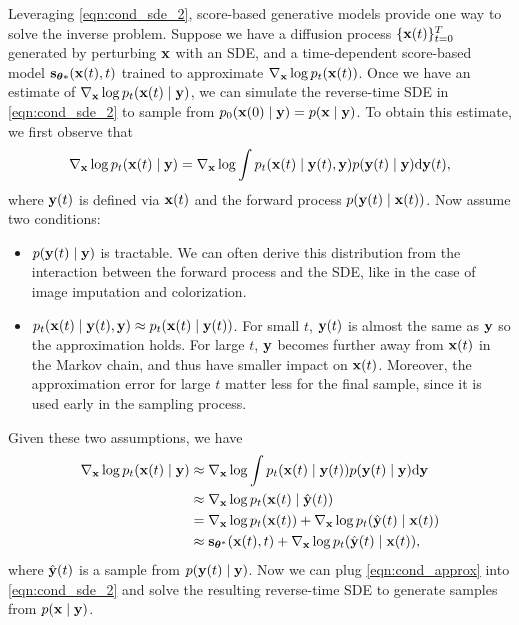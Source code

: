 Leveraging \cref{eqn:cond_sde_2}, score-based generative models provide one way to solve the inverse problem. Suppose we have a diffusion process $\{\mathbf{x}(t)\}_{t=0}^T$ generated by perturbing $\mathbf{x}$ with an SDE, and a time-dependent score-based model $\mathbf{s}_{{\boldsymbol{\theta}}*}(\mathbf{x}(t), t)$ trained to approximate $\nabla_{\mathbf{x}} \log p_t(\mathbf{x}(t))$. Once we have an estimate of $\nabla_{\mathbf{x}} \log p_t(\mathbf{x}(t) \mid \mathbf{y})$, we can simulate the reverse-time SDE in \cref{eqn:cond_sde_2} to sample from $p_0(\mathbf{x}(0) \mid \mathbf{y}) = p(\mathbf{x} \mid \mathbf{y})$. To obtain this estimate, we first observe that
\begin{align*}
    \nabla_{\mathbf{x}} \log p_t(\mathbf{x}(t) \mid \mathbf{y}) = \nabla_{\mathbf{x}} \log \int p_t(\mathbf{x}(t) \mid \mathbf{y}(t), \mathbf{y}) p(\mathbf{y}(t) \mid \mathbf{y}) \mathrm{d} \mathbf{y}(t),
\end{align*}
where $\mathbf{y}(t)$ is defined via $\mathbf{x}(t)$ and the forward process $p(\mathbf{y}(t) \mid \mathbf{x}(t))$. Now assume two conditions:
\begin{itemize}
    \item $p(\mathbf{y}(t) \mid \mathbf{y})$ is tractable. We can often derive this distribution from the interaction between the forward process and the SDE, like in the case of image imputation and colorization.
    \item $p_t(\mathbf{x}(t) \mid \mathbf{y}(t), \mathbf{y}) \approx p_t(\mathbf{x}(t) \mid \mathbf{y}(t))$. For small $t$, $\mathbf{y}(t)$ is almost the same as $\mathbf{y}$ so the approximation holds. For large $t$, $\mathbf{y}$ becomes further away from $\mathbf{x}(t)$ in the Markov chain, and thus have smaller impact on $\mathbf{x}(t)$. Moreover, the approximation error for large $t$ matter less for the final sample, since it is used early in the sampling process.
\end{itemize}
Given these two assumptions, we have
\begin{align}
    \nabla_{\mathbf{x}} \log p_t(\mathbf{x}(t) \mid \mathbf{y}) &\approx \nabla_{\mathbf{x}} \log \int p_t(\mathbf{x}(t) \mid \mathbf{y}(t)) p(\mathbf{y}(t) \mid \mathbf{y}) \mathrm{d} \mathbf{y} \notag\\
    &\approx \nabla_{\mathbf{x}} \log p_t(\mathbf{x}(t) \mid \hat{\mathbf{y}}(t)) \notag\\
    &= \nabla_{\mathbf{x}} \log p_t(\mathbf{x}(t)) + \nabla_{\mathbf{x}} \log p_t(\hat{\mathbf{y}}(t) \mid \mathbf{x}(t)) \notag\\
    &\approx \mathbf{s}_{{\boldsymbol{\theta}}^*}(\mathbf{x}(t), t) + \nabla_{\mathbf{x}} \log p_t(\hat{\mathbf{y}}(t) \mid \mathbf{x}(t)), \label{eqn:cond_approx}
\end{align}
where $\hat{\mathbf{y}}(t)$ is a sample from $p(\mathbf{y}(t) \mid \mathbf{y})$. Now we can plug \cref{eqn:cond_approx} into \cref{eqn:cond_sde_2} and solve the resulting reverse-time SDE to generate samples from $p(\mathbf{x} \mid \mathbf{y})$.

